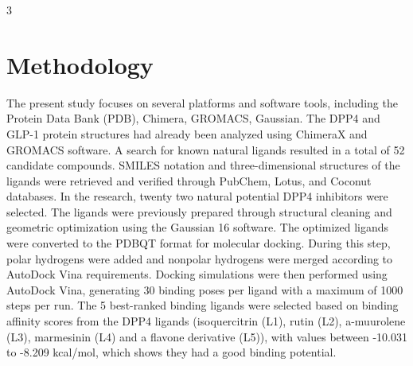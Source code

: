 \documentclass[portrait,final,20pt,ra0]{sciposter}
\begin{document}
\begin{multicols*}{3}
  \section*{Methodology}
The present study focuses on several platforms and software tools, including the Protein Data Bank (PDB), Chimera, GROMACS, Gaussian. The DPP4 and GLP-1 protein structures had already been analyzed using ChimeraX and GROMACS software. A search for known natural ligands resulted in a total of 52 candidate compounds. SMILES notation and three-dimensional structures of the ligands were retrieved and verified through PubChem, Lotus, and Coconut databases. In the research,  twenty two natural potential DPP4 inhibitors were selected. The ligands were previously prepared through structural cleaning and geometric optimization using the Gaussian 16 software. The optimized ligands were converted to the PDBQT format for molecular docking. During this step, polar hydrogens were added and nonpolar hydrogens were merged according to AutoDock Vina requirements. Docking simulations were then performed using AutoDock Vina, generating 30 binding poses per ligand with a maximum of 1000 steps per run. The 5 best-ranked binding ligands were selected based on binding affinity scores from the DPP4 ligands (isoquercitrin (L1), rutin (L2), a-muurolene (L3), marmesinin (L4) and a flavone derivative (L5)), with values between -10.031 to -8.209 kcal/mol, which shows they had a good binding potential.



\end{multicols*}
\end{document}
